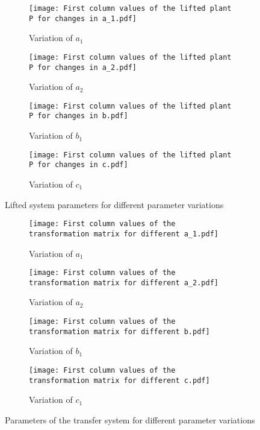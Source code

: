 \begin{figure}
    \centering
    \begin{subfigure}[t]{0.495\textwidth}
        \centering
        \texttt{[image: First column values of the lifted plant P for changes in a\_1.pdf]}
        \caption{Variation of $a_1$}
    \end{subfigure}
    \hfill
    \begin{subfigure}[t]{0.495\textwidth}
        \centering
        \texttt{[image: First column values of the lifted plant P for changes in a\_2.pdf]}
        \caption{Variation of $a_2$}
    \end{subfigure}
    
    \begin{subfigure}[t]{0.495\textwidth}
        \centering
        \texttt{[image: First column values of the lifted plant P for changes in b.pdf]}
        \caption{Variation of $b_1$}
    \end{subfigure}
    \hfill
    \begin{subfigure}[t]{0.495\textwidth}
        \centering
        \texttt{[image: First column values of the lifted plant P for changes in c.pdf]}
        \caption{Variation of $c_1$}
    \end{subfigure}
    \caption[Parameter Variations -- Lifted System Parameters]{Lifted system parameters for different parameter variations}
    \label{fig:app_lifted_params}
\end{figure}

\begin{figure}
    \centering
    \begin{subfigure}[t]{0.495\textwidth}
        \centering
        \texttt{[image: First column values of the transformation matrix for different a\_1.pdf]}
        \caption{Variation of $a_1$}
    \end{subfigure}
    \hfill
    \begin{subfigure}[t]{0.495\textwidth}
        \centering
        \texttt{[image: First column values of the transformation matrix for different a\_2.pdf]}
        \caption{Variation of $a_2$}
    \end{subfigure}
    
    \begin{subfigure}[t]{0.495\textwidth}
        \centering
        \texttt{[image: First column values of the transformation matrix for different b.pdf]}
        \caption{Variation of $b_1$}
    \end{subfigure}
    \hfill
    \begin{subfigure}[t]{0.495\textwidth}
        \centering
        \texttt{[image: First column values of the transformation matrix for different c.pdf]}
        \caption{Variation of $c_1$}
    \end{subfigure}
    \caption[Parameter Variations -- Transfer Map Parameters]{Parameters of the transfer system for different parameter variations}
    \label{fig:app_lifted_transfer}
\end{figure}

